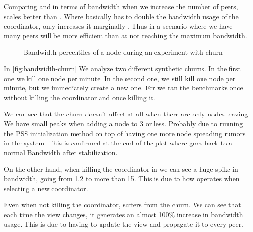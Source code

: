 Comparing \epto and \jgroups in terms of bandwidth when we increase the number of peers, \epto scales better than \jgroups. Where \jgroups basically has to double the bandwidth usage of the coordinator, \epto only increases it marginally . Thus in a scenario where we have many peers \epto will be more efficient than \jgroups at not reaching the maximum bandwidth.

\begin{figure}[hpt]
	\centering
	
	\vspace{-2mm} 
	\caption{Bandwidth percentiles of a node during an experiment with churn}
	\vspace{-2mm} 
	\label{fig:bandwidth-churn}
\end{figure}

In \autoref{fig:bandwidth-churn} We analyze two different synthetic churns. In the first one we kill one node per minute. In the second one, we still kill one node per minute, but we immediately create a new one. For \jgroups we ran the benchmarks once without killing the coordinator and once killing it.

We can see that the churn doesn't affect  \epto at all when there are only nodes leaving. We have small peaks when adding a node to \SI{3}{\mbps} or less. Probably due to running the PSS initialization method on top of having one more node spreading rumors in the system. This is confirmed at the end of the plot where \epto goes back to a normal Bandwidth after stabilization.

On the other hand, when killing the coordinator in \jgroups we can see a huge spike in bandwidth, going from \SI{1.2}{\mbps} to more than \SI{15}{\mbps}. This is due to how \jgroups operates when selecting a new coordinator.

Even when not killing the coordinator, \jgroups suffers from the churn. We can see that each time the view changes, it generates an almost 100\% increase in bandwidth usage. This is due to \jgroups having to update the view and propagate it to every peer.

